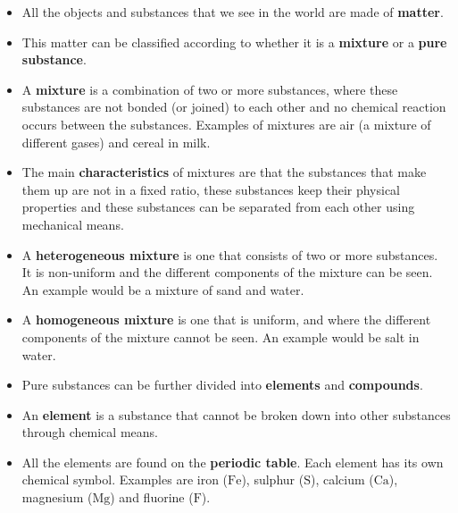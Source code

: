             \nopagebreak
      \label{m38706*id67458}\begin{itemize}[noitemsep]
            \label{m38706*uid114}\item All the objects and substances that we see in the world are made of \textbf{matter}.
\label{m38706*uid115}\item This matter can be classified according to whether it is a \textbf{mixture} or a \textbf{pure substance}.
\label{m38706*uid116}\item A \textbf{mixture} is a combination of two or more substances, where these substances are not bonded (or joined) to each other and no chemical reaction occurs between the substances. Examples of mixtures are air (a mixture of different gases) and cereal in milk.
\label{m38706*uid117}\item The main \textbf{characteristics} of mixtures are that the substances that make them up are not in a fixed ratio, these substances keep their physical properties and these substances can be separated from each other using mechanical means.
\label{m38706*uid118}\item A \textbf{heterogeneous mixture} is one that consists of two or more substances. It is non-uniform and the different components of the mixture can be seen. An example would be a mixture of sand and water.
\label{m38706*uid119}\item A \textbf{homogeneous mixture} is one that is uniform, and where the different components of the mixture cannot be seen. An example would be salt in water.
\label{m38706*uid121}\item Pure substances can be further divided into \textbf{elements} and \textbf{compounds}.
\label{m38706*uid122}\item An \textbf{element} is a substance that cannot be broken down into other substances through chemical means.
\label{m38706*uid123}\item All the elements are found on the \textbf{periodic table}. Each element has its own chemical symbol. Examples are iron ($\text{Fe}$), sulphur ($\text{S}$), calcium ($\text{Ca}$), magnesium ($\text{Mg}$) and fluorine ($\text{F}$).

\end{itemize}
